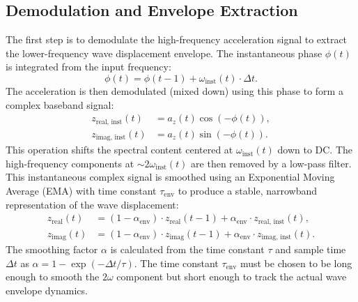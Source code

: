 \documentclass[11pt]{article}
\begin{document}
\subsection{Demodulation and Envelope Extraction}
The first step is to demodulate the high-frequency acceleration signal to extract the lower-frequency wave displacement envelope. The instantaneous phase $\phi(t)$ is integrated from the input frequency:
\begin{equation}
\phi(t) = \phi(t-1) + \omega_{\text{inst}}(t) \cdot \Delta t.
\end{equation}
The acceleration is then demodulated (mixed down) using this phase to form a complex baseband signal:
\begin{align}
z_{\text{real, inst}}(t) &= a_z(t)\cos(-\phi(t)), \\
z_{\text{imag, inst}}(t) &= a_z(t)\sin(-\phi(t)).
\end{align}
This operation shifts the spectral content centered at $\omega_{\text{inst}}(t)$ down to DC. The high-frequency components at $\sim 2\omega_{\text{inst}}(t)$ are then removed by a low-pass filter. This instantaneous complex signal is smoothed using an Exponential Moving Average (EMA) with time constant $\tau_{\text{env}}$ to produce a stable, narrowband representation of the wave displacement:
\begin{align}
z_{\text{real}}(t) &= (1 - \alpha_{\text{env}}) \cdot z_{\text{real}}(t-1) + \alpha_{\text{env}} \cdot z_{\text{real, inst}}(t), \\
z_{\text{imag}}(t) &= (1 - \alpha_{\text{env}}) \cdot z_{\text{imag}}(t-1) + \alpha_{\text{env}} \cdot z_{\text{imag, inst}}(t).
\end{align}
The smoothing factor $\alpha$ is calculated from the time constant $\tau$ and sample time $\Delta t$ as $\alpha = 1 - \exp(-\Delta t / \tau)$. The time constant $\tau_{\text{env}}$ must be chosen to be long enough to smooth the $2\omega$ component but short enough to track the actual wave envelope dynamics.
\end{document}
